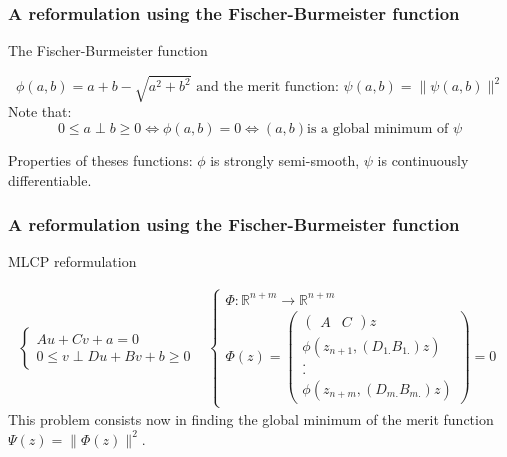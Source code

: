 
\frame
{
\frametitle{A reformulation using the Fischer-Burmeister function}
\begin{block}{ The Fischer-Burmeister function}
 
\[\phi (a,b) = a+b-\sqrt{a^2+b^2} \textrm{ and the merit function: } \psi (a,b) = \| \psi(a,b)\|^2 \]
Note that:
\[  0 \le a \perp     b   \ge 0 \Longleftrightarrow \phi (a,b) =0 \Longleftrightarrow (a,b) \textrm{is a
global minimum of } \psi \]
\end{block}

 Properties of theses functions: $\phi$ is strongly semi-smooth, $\psi$ is continuously differentiable.

\begin{figure}[h]
\centerline{
 \scalebox{0.35}{
    
    
 }
}
\end{figure}

 

}

\frame
{
\frametitle{A reformulation using the Fischer-Burmeister function}


\begin{block}{ MLCP reformulation}

\begin{equation}
  \begin{array}{cc}
   \begin{cases}
    A u + C v + a =0 \\
    {0} \le {v} \perp     Du +B v +b   \ge {0}
    \end{cases}&
   \begin{cases}
   \Phi :\mathbb{R}^{n+m} \longrightarrow \mathbb{R}^{n+m}\\
   \Phi(z)=\left(\begin{array}{c}
   \left(\begin{array}{cc}
   A&C
   \end{array}\right)z\\
   \phi(z_{n+1},(D_{1.}B_{1.})z)\\
   .\\
   .\\
   \phi(z_{n+m},(D_{m.}B_{m.})z)
   \end{array}\right)=0
    \end{cases}
  \end{array}
\end{equation}
This problem consists now in finding the global minimum of the merit function $\Psi(z)=\| \Phi(z)\|^2$.
 
\end{block}




}


